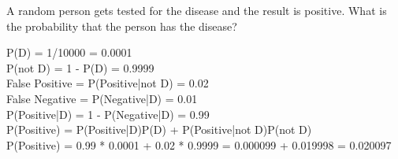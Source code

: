 \documentclass{article}%
\begin{document}
\begin{enumerate}
    A random person gets tested for the disease and the result is positive. What is the probability that the person has the disease?

    P(D) = 1/10000 = 0.0001\\
    P(not D) = 1 - P(D) = 0.9999\\
    False Positive = P(Positive|not D) = 0.02\\
    False Negative = P(Negative|D) = 0.01\\
    P(Positive|D) = 1 - P(Negative|D) = 0.99\\
    P(Positive) = P(Positive|D)P(D) + P(Positive|not D)P(not D)\\
    P(Positive) = 0.99 * 0.0001 + 0.02 * 0.9999 = 0.000099 + 0.019998 = 0.020097
    
\end{enumerate}
\end{document}

